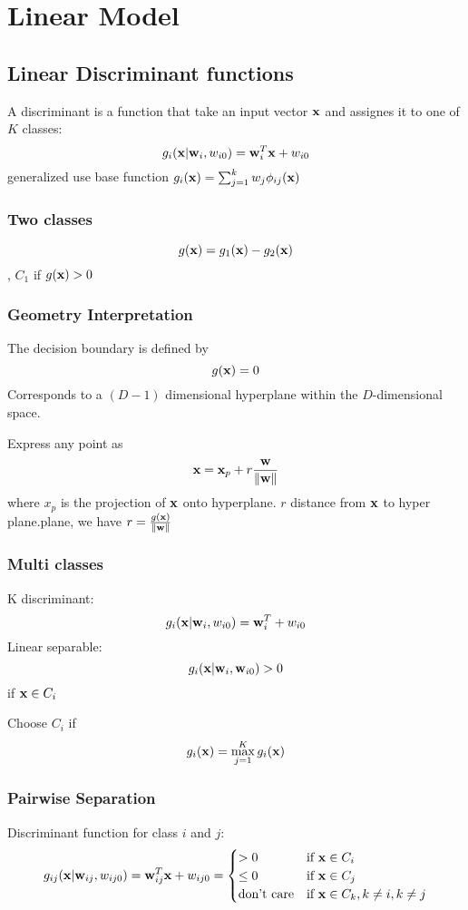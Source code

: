 \chapter{Linear Model}
\section{Linear Discriminant functions}
A discriminant is a function that take an input vector $\mathbf{x}$ and assignes
it to one of $K$ classes:
\[g_i(\mathbf{x}|\mathbf{w}_i, w_{i0}) =\mathbf{w}_i^T\mathbf{x} + w_{i0}\] generalized use base
function $g_i(\mathbf{x}) = \sum_{j=1}^k w_j \phi_{ij}(\mathbf{x})$
\subsection{Two classes}
\[g(\mathbf{x}) = g_1(\mathbf{x}) - g_2(\mathbf{x}) \], $C_1$ if $g(\mathbf{x})>0$

\subsection{Geometry Interpretation}
The decision boundary is defined by 
\[ g(\mathbf{x}) = 0\]
Corresponds to a $(D-1)$ dimensional hyperplane within the $D$-dimensional
space.

    Express any point as 
    \[\mathbf{x} = \mathbf{x}_p  + r\frac{\mathbf{w}}{\|\mathbf{w}\|}\]
    where $x_p$ is the  projection of $\mathbf{x}$ onto hyperplane. $r$ distance
    from $\mathbf{x}$ to hyper plane.plane, we have $r=\frac{g(\mathbf{x})}{\|\mathbf{w}\|}$
\subsection{Multi classes} 
K discriminant:
\[g_i(\mathbf{x} |\mathbf{w}_i, w_{i0}) = \mathbf{w}_i^T + w_{i0}\]
Linear separable: \[g_i(\mathbf{x}|\mathbf{w}_i, \mathbf{w}_{i0}) > 0\] if $\mathbf{x} \in
        C_i$
        
        Choose $C_i$ if \[g_i(\mathbf{x}) = \max_{j=1}^Kg_i(\mathbf{x})\]

\subsection{Pairwise Separation} 
    Discriminant function for class $i$ and $j$:
        \[
            g_{ij} (\mathbf{x}|\mathbf{w}_{ij}, w_{ij0}) = \mathbf{w}_{ij}^T\mathbf{x} + w_{ij0} =
            \begin{cases}
                > 0 & \mbox{if } \mathbf{x} \in C_i\\
                \leq 0 & \mbox{if } \mathbf{x} \in C_j\\
                \mbox{don't care} & \mbox{if } \mathbf{x} \in C_k, k\neq i, k\neq j
            \end{cases} \]
